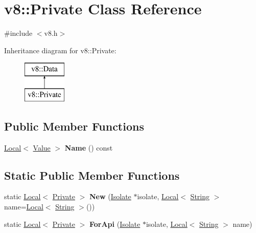 \hypertarget{classv8_1_1_private}{}\section{v8\+:\+:Private Class Reference}
\label{classv8_1_1_private}


{\ttfamily \#include $<$v8.\+h$>$}

Inheritance diagram for v8\+:\+:Private\+:\begin{figure}[H]
\begin{center}
\leavevmode
\includegraphics[height=2.000000cm]{classv8_1_1_private}
\end{center}
\end{figure}
\subsection*{Public Member Functions}
\begin{DoxyCompactItemize}
\item 
\hyperlink{classv8_1_1_local}{Local}$<$ \hyperlink{classv8_1_1_value}{Value} $>$ {\bfseries Name} () const \hypertarget{classv8_1_1_private_a346820b1e830262d7f4f31e5c5ac7304}{}\label{classv8_1_1_private_a346820b1e830262d7f4f31e5c5ac7304}

\end{DoxyCompactItemize}
\subsection*{Static Public Member Functions}
\begin{DoxyCompactItemize}
\item 
static \hyperlink{classv8_1_1_local}{Local}$<$ \hyperlink{classv8_1_1_private}{Private} $>$ {\bfseries New} (\hyperlink{classv8_1_1_isolate}{Isolate} $\ast$isolate, \hyperlink{classv8_1_1_local}{Local}$<$ \hyperlink{classv8_1_1_string}{String} $>$ name=\hyperlink{classv8_1_1_local}{Local}$<$ \hyperlink{classv8_1_1_string}{String} $>$())\hypertarget{classv8_1_1_private_ae43aa9516121ed7a24cf5bba1654b653}{}\label{classv8_1_1_private_ae43aa9516121ed7a24cf5bba1654b653}

\item 
static \hyperlink{classv8_1_1_local}{Local}$<$ \hyperlink{classv8_1_1_private}{Private} $>$ {\bfseries For\+Api} (\hyperlink{classv8_1_1_isolate}{Isolate} $\ast$isolate, \hyperlink{classv8_1_1_local}{Local}$<$ \hyperlink{classv8_1_1_string}{String} $>$ name)\hypertarget{classv8_1_1_private_a0ab8628387166b8a8abc6e9b6f40ad55}{}\label{classv8_1_1_private_a0ab8628387166b8a8abc6e9b6f40ad55}

\end{DoxyCompactItemize}


